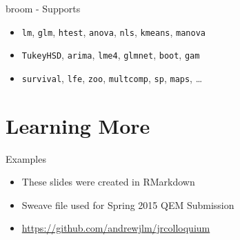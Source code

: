 \begin{frame}{broom - Supports}

\begin{itemize}
\itemsep1pt\parskip0pt
\item
  \texttt{lm}, \texttt{glm}, \texttt{htest}, \texttt{anova},
  \texttt{nls}, \texttt{kmeans}, \texttt{manova}
\item
  \texttt{TukeyHSD}, \texttt{arima}, \texttt{lme4}, \texttt{glmnet},
  \texttt{boot}, \texttt{gam}
\item
  \texttt{survival}, \texttt{lfe}, \texttt{zoo}, \texttt{multcomp},
  \texttt{sp}, \texttt{maps}, \ldots
\end{itemize}

\end{frame}

\section{Learning More}\label{learning-more}

\begin{frame}{Examples}

\begin{itemize}
\itemsep1pt\parskip0pt
\item
  These slides were created in RMarkdown
\item
  Sweave file used for Spring 2015 QEM Submission
\item
  \url{https://github.com/andrewjlm/jrcolloquium}
\end{itemize}

\end{frame}
